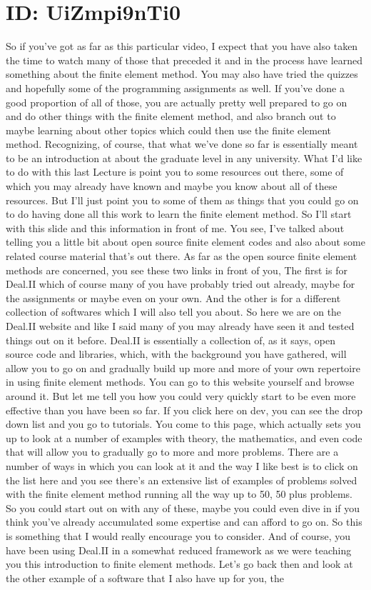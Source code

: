 \documentclass[10pt]{article}
\begin{document}
\section*{ID: UiZmpi9nTi0}
So if you've got as far as this particular video, I expect that you have also taken the time to watch many of those that preceded it and in the process have learned something about the finite element method. You may also have tried the quizzes and hopefully some of the programming assignments as well. If you've done a good proportion of all of those, you are actually pretty well prepared to go on and do other things with the finite element method, and also branch out to maybe learning about other topics which could then use the finite element method. Recognizing, of course, that what we've done so far is essentially meant to be an introduction at about the graduate level in any university. What I'd like to do with this last Lecture is point you to some resources out there, some of which you may already have known and maybe you know about all of these resources. But I'll just point you to some of them as things that you could go on to do having done all this work to learn the finite element method. So I'll start with this slide and this information in front of me. You see, I've talked about telling you a little bit about open source finite element codes and also about some related course material that's out there. As far as the open source finite element methods are concerned, you see these two links in front of you, The first is for Deal.II which of course many of you have probably tried out already, maybe for the assignments or maybe even on your own. And the other is for a different collection of softwares which I will also tell you about. So here we are on the Deal.II website and like I said many of you may already have seen it and tested things out on it before. Deal.II is essentially a collection of, as it says, open source code and libraries, which, with the background you have gathered, will allow you to go on and gradually build up more and more of your own repertoire in using finite element methods. You can go to this website yourself and browse around it. But let me tell you how you could very quickly start to be even more effective than you have been so far. If you click here on dev, you can see the drop down list and you go to tutorials. You come to this page, which actually sets you up to look at a number of examples with theory, the mathematics, and even code that will allow you to gradually go to more and more problems. There are a number of ways in which you can look at it and the way I like best is to click on the list here and you see there's an extensive list of examples of problems solved with the finite element method running all the way up to 50, 50 plus problems. So you could start out on with any of these, maybe you could even dive in if you think you've already accumulated some expertise and can afford to go on. So this is something that I would really encourage you to consider. And of course, you have been using Deal.II in a somewhat reduced framework as we were teaching you this introduction to finite element methods. Let's go back then and look at the other example of a software that I also have up for you, the 
\end{document}
